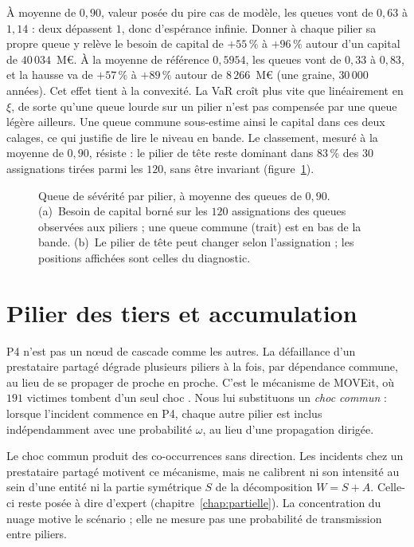 À moyenne de $0{,}90$, valeur posée du pire cas de modèle, les queues vont de $0{,}63$ à $1{,}14$ : deux dépassent $1$, donc d'espérance infinie. Donner à chaque pilier sa propre queue y relève le besoin de capital de $+55\,\%$ à $+96\,\%$ autour d'un capital de $40\,034$~M\euro{}. À la moyenne de référence $0{,}5954$, les queues vont de $0{,}33$ à $0{,}83$, et la hausse va de $+57\,\%$ à $+89\,\%$ autour de $8\,266$~M\euro{} (une graine, $30\,000$ années). Cet effet tient à la convexité. La VaR croît plus vite que linéairement en $\xi$, de sorte qu'une
queue lourde sur un pilier n'est pas compensée par une queue légère ailleurs. Une queue commune
sous-estime ainsi le capital dans ces deux calages, ce qui justifie de lire le niveau en bande. Le classement, mesuré à la moyenne de $0{,}90$,
résiste : le pilier de tête reste dominant dans $83\,\%$ des $30$ assignations tirées parmi les $120$, sans être invariant
(figure~\ref{fig:xi-pilier}).

\begin{figure}[H]\centering
{}
\caption{Queue de sévérité par pilier, à moyenne des queues de $0{,}90$. (a)~Besoin de capital borné sur les $120$ assignations des queues
observées aux piliers ; une queue commune (trait) est en bas de la bande. (b)~Le pilier de tête peut changer selon l'assignation ; les positions affichées sont celles du diagnostic.}
\label{fig:xi-pilier}
\end{figure}

\section{Pilier des tiers et accumulation}
\label{sec:p4-accumulation}

P4 n'est pas un n\oe{}ud de cascade comme les autres. La défaillance d'un prestataire partagé dégrade
plusieurs piliers à la fois, par dépendance commune, au lieu de se propager de proche en proche.
C'est le mécanisme de MOVEit, où $191$ victimes tombent d'un seul choc \matcomp.
Nous lui substituons un \emph{choc commun} : lorsque l'incident commence en P4, chaque autre pilier
est inclus indépendamment avec une probabilité $\omega$, au lieu d'une propagation dirigée.

Le choc commun produit des co-occurrences sans direction. Les incidents chez un prestataire partagé
motivent ce mécanisme, mais ne calibrent ni son intensité au sein d'une entité ni la partie symétrique
$S$ de la décomposition $W=S+A$. Celle-ci reste posée à dire d'expert
(chapitre~\ref{chap:partielle}). La concentration du nuage motive le scénario ; elle ne mesure
pas une probabilité de transmission entre piliers.

